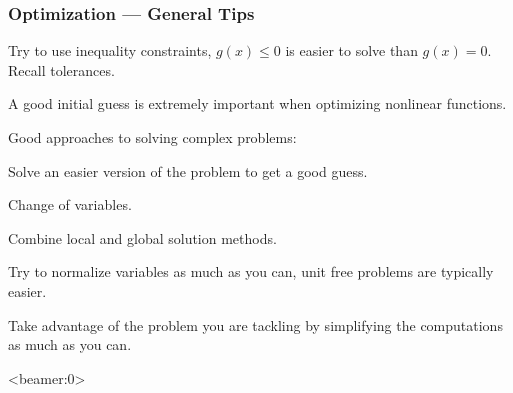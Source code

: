 \documentclass[11pt,xcolor={svgnames},aspectratio=169,usepdftitle=false]{beamer}
\let\toneitemize\itemize
\let\ttwoitemize\enditemize
\renewenvironment{itemize}{\toneitemize\addtolength{\itemsep}{0.7\baselineskip}}{\ttwoitemize}
\begin{document}
\begin{frame}
  \frametitle{Optimization --- General Tips}
\begin{itemize}
  \item Try to use inequality constraints, $g(x) \leq 0$ is easier to solve than $g(x) = 0$. Recall tolerances.
  \item A good initial guess is extremely important when optimizing nonlinear functions.
  \item Good approaches to solving complex problems:
  \begin{itemize}
    \item Solve an easier version of the problem to get a good guess.
    \item Change of variables.
    \item Combine local and global solution methods.
  \end{itemize}
  \item Try to normalize variables as much as you can, unit free problems are typically easier.
  \item Take advantage of the problem you are tackling by simplifying the computations as much as you can.
\end{itemize}
\end{frame}

\begin{frame}<beamer:0>
  \nocite{*}
  
  
\end{frame}
\end{document}
